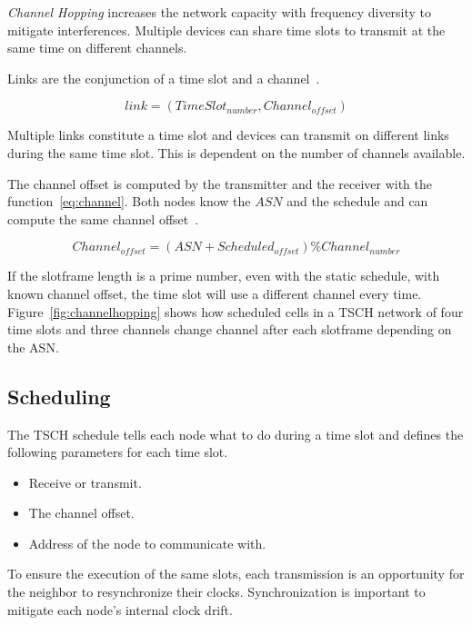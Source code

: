 \emph{Channel Hopping} increases the network capacity with frequency diversity
to mitigate interferences.
Multiple devices can share time slots to transmit at the same time on different
channels.

Links are the conjunction of a time slot and a channel~\cite{Chen2013PerformanceAO}.

\begin{equation}
  \label{eq:links}
  link = (TimeSlot_{number}, Channel_{offset})
\end{equation}

Multiple links constitute a time slot and devices can transmit on different 
links during the same time slot.
This is dependent on the number of channels available.

The channel offset is computed by the transmitter and the receiver with the
function~\ref{eq:channel}. Both nodes know the $ASN$ and the schedule and can
compute the same channel offset~\cite{rfc7554}.

\begin{equation}
  \label{eq:channel}
  Channel_{offset} = (ASN + Scheduled_{offset}) \% Channel_{number}
\end{equation}

If the slotframe length is a prime number, even with the static schedule,
with known channel offset, the time slot will use a different channel every time.
Figure~\ref{fig:channelhopping} shows how scheduled cells in a TSCH network of
four time slots and three channels change channel after each slotframe depending 
on the ASN.



\subsection{Scheduling}

The TSCH schedule tells each node what to do during a time slot and defines the
following parameters for each time slot.

\begin{itemize}
  \item Receive or transmit.
  \item The channel offset.
  \item Address of the node to communicate with.
\end{itemize}

To ensure the execution of the same slots, each transmission is an opportunity 
for the neighbor to resynchronize their clocks.
Synchronization is important to mitigate each node's internal clock drift.

